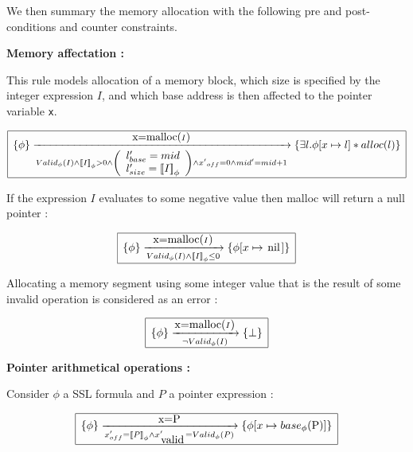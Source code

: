 \documentclass[a4paper,twoside,12pt]{report}
\newcommand{\Alloc}[1]{alloc(#1)}
\newcommand{\Unsep}[0]{\ast}
\newcommand{\Sep}[2]{#1 \Unsep #2}
\newcommand{\Pointsto}[2]{ #1 \mapsto #2}
\newcommand{\nil}[0]{\lstinline!nil!}
\newcommand{\Addrep}[2]{#1 \lbrack #2 \rbrack}
\newcommand{\base}[2]{base_{#1}(#2)}
\newcommand{\lbase}[1]{#1_{base}}
\newcommand{\lsize}[1]{#1_{size}}
\newcommand{\locvar}[3]{
\left ( \begin{array}{l}
\lbase{#1}=#2 \\
\lsize{#1}=#3
\end{array} \right )
}
\newcommand{\transmodel}[4]{\lbrace #1 \rbrace \arrow{#2}{#3} \lbrace #4 \rbrace }
\newcommand{\ptroffset}[1]{{#1}_{off}}
\newcommand{\gmallocid}[0]{mid}
\newcommand{\valid}[1]{{#1}_{\mbox{\lstinline!valid!}}}
\newcommand{\isvalid}[2]{Valid_{#1}(#2)}
\newcommand{\interpa}[2]{\sem{#2}_{#1}}
\begin{document}
We then summary the memory allocation with the following pre and post-conditions and counter constraints.

\textbf{Memory affectation :}

This rule models allocation of a memory block, which size is specified by the
integer expression $I$, and which base address is then affected to the
pointer variable \lstinline!x!.

$$
\begin{array}{|l|}
\hline
\transmodel{\phi}{\mbox{\lstinline!x=malloc(!} I \mbox{\lstinline!)!}}{\isvalid{\phi}{I} \wedge \interpa{\phi}{I} > 0 \wedge \locvar{l^{\prime}}{\gmallocid}{\interpa{\phi}{I}} \wedge \ptroffset{x^{\prime}}=0 \wedge \gmallocid^{\prime}=\gmallocid + 1}{\Sep{\exists l. \Addrep{\phi}{\Pointsto{x}{l}}}{\Alloc{l}}} \\
\hline
\end{array}
$$ 

If the expression $I$ evaluates to some negative value then malloc will return a null pointer :

$$
\begin{array}{|l|}
\hline
\transmodel{\phi}{\mbox{\lstinline!x=malloc(!} I \mbox{\lstinline!)!}}{\isvalid{\phi}{I} \wedge \interpa{\phi}{I} \leq 0 }{\Addrep{\phi}{\Pointsto{x}{\nil}}} \\
\hline
\end{array}
$$ 

Allocating a memory segment using some integer value that is the result of some
invalid operation is considered as an error :

$$
\begin{array}{|l|}
\hline
\transmodel{\phi}{\mbox{\lstinline!x=malloc(!} I \mbox{\lstinline!)!}}{\neg \isvalid{\phi}{I}}{\bot} \\
\hline
\end{array}
$$ 


\textbf{Pointer arithmetical operations :}

Consider $\phi$ a SSL formula and $P$ a pointer expression :

$$
\begin{array}{|l|}
\hline
\transmodel{\phi}{\mbox{x=P}}{\ptroffset{x}^{\prime}=\interpa{\phi}{P} \wedge \valid{x}^{\prime}=\isvalid{\phi}{P}}{\Addrep{\phi}{\Pointsto{x}{\base{\phi}{\mbox{\lstinline!P!}}}}} \\
\hline
\end{array}
$$ 
\end{document}
